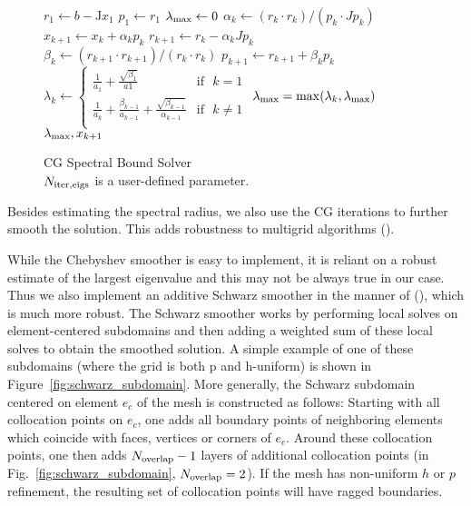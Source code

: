 \begin{figure}
  \begin{algorithm}[H]
    \caption{\label{alg:CG_Spectral_Bound_Solver}
      CG Spectral Bound Solver\\ $N_{\rm{iter,eigs}}$ is a user-defined parameter.
    }
    \begin{algorithmic}[1]
      \State $r_1 \leftarrow b - \mathrm{J}x_1$  
      \State $p_1 \leftarrow r_1$
      \State $\lambda_{\rm{max}} \leftarrow 0$
      \State $\alpha_k \leftarrow (r_{k} \cdot r_{k})/(p_k \cdot Jp_k)$
      \State $x_{k+1} \leftarrow x_{k} + \alpha_k p_k$
      \State $r_{k+1} \leftarrow r_{k} - \alpha_kJ p_k$
      \State $\beta_k \leftarrow (r_{k+1} \cdot r_{k+1})/(r_{k} \cdot r_{k})$ 
      \State $p_{k+1} \leftarrow r_{k+1} + \beta_kp_{k}$
      \State  $\lambda_k\leftarrow 
\begin{cases}
      \frac{1}{a_1} + \frac{\sqrt{\beta_1}}{a1} & \text{if} \,\,\,\, k = 1 \\[10pt]
    \frac{1}{a_{k}} + \frac{\beta_{k-1}}{a_{k-1}} + \frac{\sqrt{\beta_{k-1}}}{\alpha_{k-1}}  & \text{if} \,\,\,\, k \neq 1\\[10pt]
  \end{cases}
$\; 
\State  $\lambda_{\rm{max}} = \max(\lambda_k, \lambda_{\rm{max}})$
\EndFor\\
\Return $\lambda_{\rm{max}},x_{k + 1}$ 
  \EndFunction
    \end{algorithmic}
  \end{algorithm}
\end{figure}

Besides estimating the spectral radius, we also use the CG iterations to further smooth the
solution. This adds robustness to multigrid algorithms (\citet*{elman2001multigrid}).

While the Chebyshev smoother is easy to implement, it is reliant on a robust estimate of the largest eigenvalue and this may not be always true in our case. Thus we also implement an additive Schwarz smoother in the manner of (\citet*{stiller2017robust}), which is much more robust. The Schwarz smoother works by performing local solves on element-centered subdomains and then adding a weighted sum of these local solves to obtain the smoothed solution. A simple example of one of these subdomains (where the grid is both p and h-uniform) is shown in Figure~\ref{fig:schwarz_subdomain}.
%
More generally, the Schwarz subdomain centered on element $e_c$
  of the mesh is constructed as follows: Starting with all collocation
  points on $e_c$, one adds all boundary points of neighboring elements
  which coincide with faces, vertices or corners of $e_c$.  Around these
  collocation points, one then
  adds $N_{\rm overlap}-1$ layers of additional collocation points (in Fig.~\ref{fig:schwarz_subdomain}, $N_{\rm overlap}=2$).  If the mesh has non-uniform $h$ or $p$ refinement, the resulting set of collocation points will have ragged boundaries.

